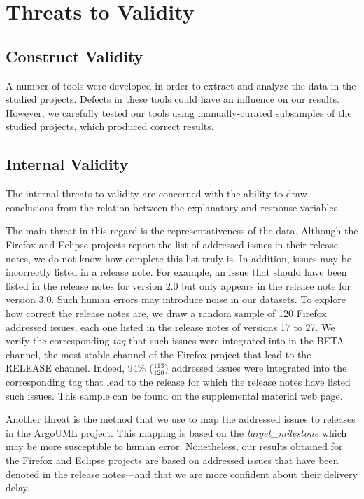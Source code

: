 \section{Threats to Validity} \label{ch4:threats}

\subsection{Construct Validity}
A number of tools were developed in order to extract and analyze the \DIFdelbegin {}\DIFdelend \DIFaddbegin {}\DIFaddend data in the studied projects. Defects in these tools could have an influence on
our results. However, we carefully tested our tools using manually-curated
subsamples of the studied projects, which produced correct results.

\subsection{Internal Validity}
The internal threats to validity are concerned with the ability to draw
conclusions from the relation between the explanatory and response variables.

The main threat in this regard is the representativeness of the data. Although
the Firefox and Eclipse projects report the list of addressed issues in their
release notes, we do not know how complete this list truly is. In addition,
issues may be incorrectly listed in a release note. For example, an issue that
should have been listed in the release notes for version 2.0 but only appears in
the release note for version 3.0. Such human errors may introduce noise in our
datasets. To explore how correct the release notes are, we draw a random sample
of 120 Firefox addressed issues, each one listed in the release notes of
versions 17 to 27. We verify the corresponding \textit{tag} that such issues
were integrated into in the BETA channel, \ie the most stable channel of the
Firefox project that lead to the RELEASE
channel.
Indeed, 94\% ($\frac{113}{120}$) addressed issues were integrated into the
corresponding tag that lead to the release for which the release notes have
listed such issues. This sample can be found on the supplemental material web
page.

Another threat is the method that we use to map the addressed issues to releases in
the ArgoUML project. This mapping is based on the \textit{target\_milestone}
which may be more susceptible to human error. Nonetheless, our results obtained
for the Firefox and Eclipse projects are based on addressed issues that have been
denoted in the release notes---and that we are more confident about their
delivery delay.

